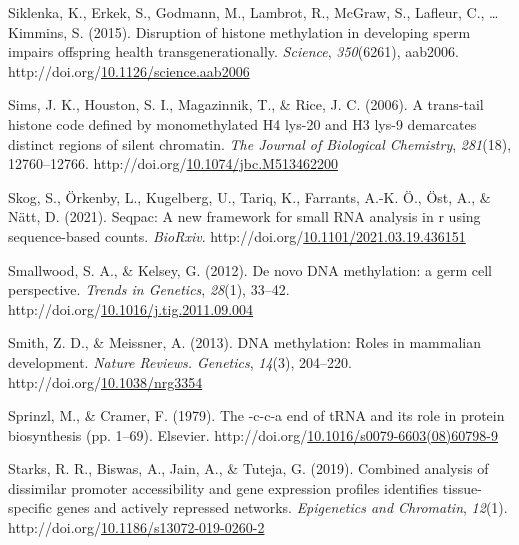 \documentclass[12pt,twoside]{reedthesis}
\newlength{\cslhangindent}
\newenvironment{CSLReferences}[2] %
 {%
  \setlength{\parindent}{0pt}
  \ifodd #1 \everypar{\setlength{\hangindent}{\cslhangindent}}\ignorespaces\fi
  \ifnum #2 > 0
  \setlength{\parskip}{#2\baselineskip}
  \fi
 }%
 {}
\begin{document}
\begin{CSLReferences}{1}{0}
\leavevmode{}%
Siklenka, K., Erkek, S., Godmann, M., Lambrot, R., McGraw, S., Lafleur, C., \ldots{} Kimmins, S. (2015). Disruption of histone methylation in developing sperm impairs offspring health transgenerationally. \emph{Science}, \emph{350}(6261), aab2006. http://doi.org/\href{https://doi.org/10.1126/science.aab2006}{10.1126/science.aab2006}

\leavevmode{}%
Sims, J. K., Houston, S. I., Magazinnik, T., \& Rice, J. C. (2006). A trans-tail histone code defined by monomethylated H4 lys-20 and H3 lys-9 demarcates distinct regions of silent chromatin. \emph{The Journal of Biological Chemistry}, \emph{281}(18), 12760--12766. http://doi.org/\href{https://doi.org/10.1074/jbc.M513462200}{10.1074/jbc.M513462200}

\leavevmode{}%
Skog, S., Örkenby, L., Kugelberg, U., Tariq, K., Farrants, A.-K. Ö., Öst, A., \& Nätt, D. (2021). Seqpac: A new framework for small RNA analysis in r using sequence-based counts. \emph{BioRxiv}. http://doi.org/\href{https://doi.org/10.1101/2021.03.19.436151}{10.1101/2021.03.19.436151}

\leavevmode{}%
Smallwood, S. A., \& Kelsey, G. (2012). De novo DNA methylation: a germ cell perspective. \emph{Trends in Genetics}, \emph{28}(1), 33--42. http://doi.org/\href{https://doi.org/10.1016/j.tig.2011.09.004}{10.1016/j.tig.2011.09.004}

\leavevmode{}%
Smith, Z. D., \& Meissner, A. (2013). DNA methylation: Roles in mammalian development. \emph{Nature Reviews. Genetics}, \emph{14}(3), 204--220. http://doi.org/\href{https://doi.org/10.1038/nrg3354}{10.1038/nrg3354}

\leavevmode{}%
Sprinzl, M., \& Cramer, F. (1979). The -c-c-a end of tRNA and its role in protein biosynthesis (pp. 1--69). Elsevier. http://doi.org/\href{https://doi.org/10.1016/s0079-6603(08)60798-9}{10.1016/s0079-6603(08)60798-9}

\leavevmode{}%
Starks, R. R., Biswas, A., Jain, A., \& Tuteja, G. (2019). Combined analysis of dissimilar promoter accessibility and gene expression profiles identifies tissue-specific genes and actively repressed networks. \emph{Epigenetics and Chromatin}, \emph{12}(1). http://doi.org/\href{https://doi.org/10.1186/s13072-019-0260-2}{10.1186/s13072-019-0260-2}


\end{CSLReferences}
\end{document}
